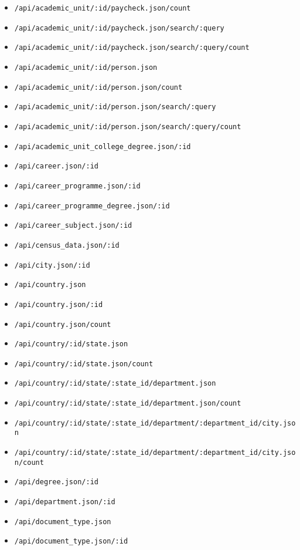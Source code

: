 \begin{itemize}
    \item \lstinline$/api/academic_unit/:id/paycheck.json/count$
    \item \lstinline$/api/academic_unit/:id/paycheck.json/search/:query$
    \item \lstinline$/api/academic_unit/:id/paycheck.json/search/:query/count$
    \item \lstinline$/api/academic_unit/:id/person.json$
    \item \lstinline$/api/academic_unit/:id/person.json/count$
    \item \lstinline$/api/academic_unit/:id/person.json/search/:query$
    \item \lstinline$/api/academic_unit/:id/person.json/search/:query/count$
    \item \lstinline$/api/academic_unit_college_degree.json/:id$
    \item \lstinline$/api/career.json/:id$
    \item \lstinline$/api/career_programme.json/:id$
    \item \lstinline$/api/career_programme_degree.json/:id$
    \item \lstinline$/api/career_subject.json/:id$
    \item \lstinline$/api/census_data.json/:id$
    \item \lstinline$/api/city.json/:id$
    \item \lstinline$/api/country.json$
    \item \lstinline$/api/country.json/:id$
    \item \lstinline$/api/country.json/count$
    \item \lstinline$/api/country/:id/state.json$
    \item \lstinline$/api/country/:id/state.json/count$
    \item \lstinline$/api/country/:id/state/:state_id/department.json$
    \item \lstinline$/api/country/:id/state/:state_id/department.json/count$
    \item \lstinline$/api/country/:id/state/:state_id/department/:department_id/city.json$
    \item \lstinline$/api/country/:id/state/:state_id/department/:department_id/city.json/count$
    \item \lstinline$/api/degree.json/:id$
    \item \lstinline$/api/department.json/:id$
    \item \lstinline$/api/document_type.json$
    \item \lstinline$/api/document_type.json/:id$

\end{itemize}
